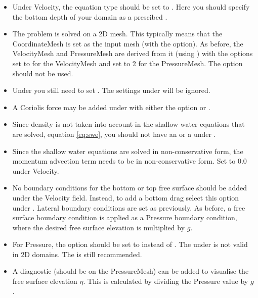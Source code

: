 \begin{itemize}
  \item Under Velocity, the equation type should be set to
    . Here you should specify the bottom depth
    of your domain as a prescibed .
  \item The problem is solved on a 2D mesh. This typically means that the
    CoordinateMesh is set as the input mesh (with the 
    option). As before, the VelocityMesh and PressureMesh are derived from it (using
    ) with the options  set to
     for the VelocityMesh and 
     set to 2 for the PressureMesh.
    The option  should not be used.
  \item Under  you still need to set
    . The settings under
     will be ignored.
  \item A Coriolis force may be added under  with
    either the option  or .
  \item Since density is not taken into account in the shallow water equations
    that are solved, equation \eqref{eq:swe}, you should not have an
     or a  under
    .
  \item Since the shallow water equations are solved in non-conservative form,
    the momentum advection term needs to be in non-conservative form. Set
     to 0.0
    under Velocity.
  \item No boundary conditions for the bottom or top free surface should be
    added under the Velocity field. Instead, to add a bottom drag select this
    option under . Lateral boundary conditions
    are set as previously. As before, a free surface boundary condition is
    applied as a Pressure boundary condition, where the desired free surface
    elevation is multiplied by $g$.
  \item For Pressure, the option  should
    be set to  instead of .
    The  under  is not
    valid in 2D domains. The  is still recommended.
  \item A diagnostic  (should be on the
    PressureMesh) can be added to
    visualise the free surface elevation $\eta$. This is calculated by dividing
    the Pressure value by $g$.
\end{itemize}

